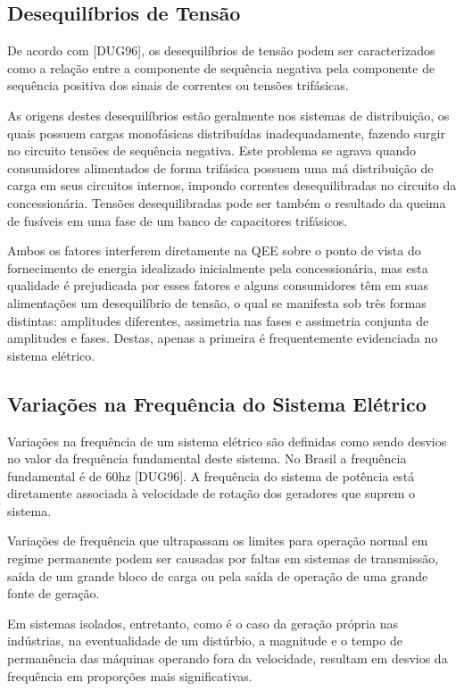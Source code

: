 \subsection{Desequilíbrios de Tensão}
\par
De acordo com [DUG96], os desequilíbrios de tensão podem ser caracterizados como a relação entre a componente de sequência negativa pela componente de sequência positiva dos sinais de correntes ou tensões trifásicas.
\par
As origens destes desequilíbrios estão geralmente nos sistemas de distribuição, os quais possuem cargas monofásicas distribuídas inadequadamente, fazendo surgir no circuito tensões de sequência negativa. Este problema se agrava quando consumidores alimentados de forma trifásica possuem uma má distribuição de carga em seus circuitos internos, impondo correntes desequilibradas no circuito da concessionária. Tensões desequilibradas pode ser também o resultado da queima de fusíveis em uma fase de um banco de capacitores trifásicos.
\par
Ambos os fatores interferem diretamente na QEE sobre o ponto de vista do fornecimento de energia idealizado inicialmente pela concessionária, mas esta qualidade é prejudicada por esses fatores e alguns consumidores têm em suas alimentações um desequilíbrio de tensão, o qual se manifesta sob três formas distintas: amplitudes diferentes, assimetria nas fases e assimetria conjunta de amplitudes e fases. Destas, apenas a primeira é frequentemente evidenciada no sistema elétrico.

\subsection{Variações na Frequência do Sistema Elétrico}
\par
Variações na frequência de um sistema elétrico são definidas como sendo desvios no valor da frequência fundamental deste sistema. No Brasil a frequência fundamental é de 60hz [DUG96]. A frequência do sistema de potência está diretamente associada à velocidade de rotação dos geradores que suprem o sistema.
\par
Variações de frequência que ultrapassam os limites para operação normal em regime permanente podem ser causadas por faltas em sistemas de transmissão, saída de um grande bloco de carga ou pela saída de operação de uma grande fonte de geração.
\par
Em sistemas isolados, entretanto, como é o caso da geração própria nas indústrias, na eventualidade de um distúrbio, a magnitude e o tempo de permanência das máquinas operando fora da velocidade, resultam em desvios da frequência em proporções mais significativas.

